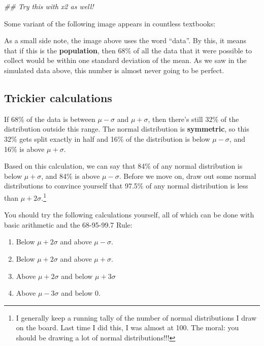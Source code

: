 \documentclass[
  letterpaper,
  DIV=11,
  numbers=noendperiod]{scrreprt}
\newenvironment{Shaded}{\begin{snugshade}}{\end{snugshade}}
\newcommand{\DocumentationTok}[1]{\textcolor[rgb]{0.37,0.37,0.37}{\textit{#1}}}
\providecommand{\tightlist}{%
  \setlength{\itemsep}{0pt}\setlength{\parskip}{0pt}}\usepackage{longtable,booktabs,array}
\begin{document}
\begin{Shaded}
\begin{Highlighting}[]
\DocumentationTok{\#\# Try this with x2 as well!}
\end{Highlighting}
\end{Shaded}

Some variant of the following image appears in countless textbooks:

As a small side note, the image above uses the word ``data''. By this,
it means that if this is the \textbf{population}, then 68\% of all the
data that it were possible to collect would be within one standard
deviation of the mean. As we saw in the simulated data above, this
number is almost never going to be perfect.

\hypertarget{trickier-calculations}{%
\subsection{Trickier calculations}\label{trickier-calculations}}

If 68\% of the data is between \(\mu - \sigma\) and \(\mu + \sigma\),
then there's still 32\% of the distribution outside this range. The
normal distribution is \textbf{symmetric}, so this 32\% gets split
exactly in half and 16\% of the distribution is below \(\mu - \sigma\),
and 16\% is above \(\mu + \sigma\).

Based on this calculation, we can say that 84\% of any normal
distribution is below \(\mu + \sigma\), and 84\% is above
\(\mu - \sigma\). Before we move on, draw out some normal distributions
to convince yourself that 97.5\% of any normal distribution is less than
\(\mu + 2\sigma\).\footnote{I generally keep a running tally of the
  number of normal distributions I draw on the board. Last time I did
  this, I was almost at 100. The moral: you should be drawing a lot of
  normal distributions!!!}

You should try the following calculations yourself, all of which can be
done with basic arithmetic and the 68-95-99.7 Rule:

\begin{enumerate}
\def\labelenumi{\arabic{enumi}.}
\tightlist
\item
  Below \(\mu+2\sigma\) and above \(\mu-\sigma\).
\item
  Below \(\mu+2\sigma\) and above \(\mu+\sigma\).
\item
  Above \(\mu + 2\sigma\) and below \(\mu + 3\sigma\)
\item
  Above \(\mu - 3\sigma\) and below 0.
\end{enumerate}
\end{document}
